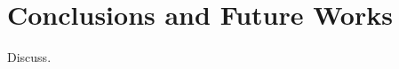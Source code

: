 \documentclass[journal]{IEEEtran}
\begin{document}
\section{Conclusions and Future Works}
Discuss.

\begin{comment}
\subsection{Subsection Heading Here}
Subsection text here.


\subsubsection{Subsubsection Heading Here}
Subsubsection text here.


%
%




\end{comment}
\end{document}
